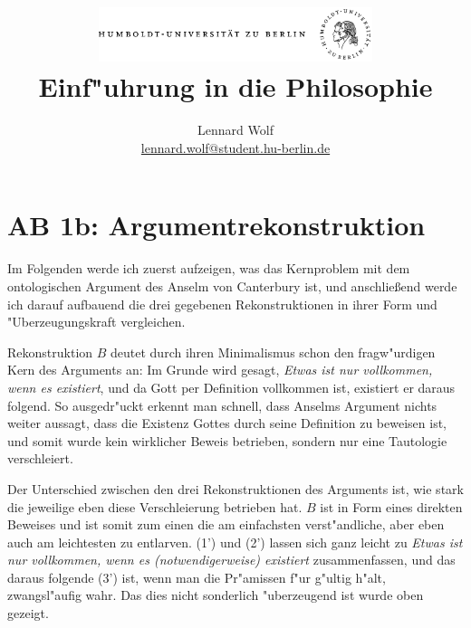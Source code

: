 \documentclass[a4paper]{article}
\begin{document}
\title{
	\includegraphics*[width=0.6\textwidth]{images/hu_logo.png}\\
	\vspace{24pt}
	Einf"uhrung in die Philosophie}
\author{Lennard Wolf\\
        \href{mailto:lennard.wolf@student.hu-berlin.de}{lennard.wolf@student.hu-berlin.de}}
\maketitle


\section*{AB 1b: Argumentrekonstruktion}
\large
Im Folgenden werde ich zuerst aufzeigen, was das Kernproblem mit dem ontologischen Argument des Anselm von Canterbury ist, und anschlie\ss end werde ich darauf aufbauend die drei gegebenen Rekonstruktionen in ihrer Form und "Uberzeugungskraft vergleichen.

Rekonstruktion $B$ deutet durch ihren Minimalismus schon den fragw"urdigen Kern des Arguments an: Im Grunde wird gesagt, \emph{Etwas ist nur vollkommen, wenn es existiert}, und da Gott per Definition vollkommen ist, existiert er daraus folgend. So ausgedr"uckt erkennt man schnell, dass Anselms Argument nichts weiter aussagt, dass die Existenz Gottes durch seine Definition zu beweisen ist, und somit wurde kein wirklicher Beweis betrieben, sondern nur eine Tautologie verschleiert.

Der Unterschied zwischen den drei Rekonstruktionen des Arguments ist, wie stark die jeweilige eben diese Verschleierung betrieben hat. $B$ ist in Form eines direkten Beweises und ist somit zum einen die am einfachsten verst"andliche, aber eben auch am leichtesten zu entlarven. (1') und (2') lassen sich ganz leicht zu \emph{Etwas ist nur vollkommen, wenn es (notwendigerweise) existiert} zusammenfassen, und das daraus folgende (3') ist, wenn man die Pr"amissen f"ur g"ultig h"alt, zwangsl"aufig wahr. Das dies nicht sonderlich "uberzeugend ist wurde oben gezeigt.
\end{document}
